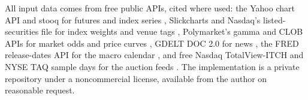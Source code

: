 All input data comes from free public APIs, cited where used: the Yahoo
chart API and stooq for futures and index series
\citep{yahoo2026chartapi,stooq2026spx}, Slickcharts and Nasdaq's
listed-securities file for index weights and venue tags
\citep{slickcharts2026sp500,nasdaqtrader2026listed}, Polymarket's gamma and
CLOB APIs for market odds and price curves
\citep{polymarket2026gamma,polymarket2026clob}, GDELT DOC 2.0 for news
\citep{gdelt2017doc}, the FRED release-dates API for the macro calendar
\citep{fred2026releasedates}, and free Nasdaq TotalView-ITCH and NYSE TAQ
sample days for the auction feeds
\citep{nasdaq2026itchsamples,nyse2026taqimbalances}. The implementation is
a private repository under a noncommercial license, available from the
author on reasonable request.
